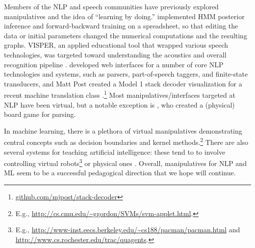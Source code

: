 \documentclass[11pt,letterpaper]{article}
\newcommand{\Note}[1]{}
\renewcommand{\Note}[1]{\hl{[#1]}}  %
\newcommand{\NoteSigned}[3]{{\sethlcolor{#2}\Note{#1: #3}}}
\newcommand{\NoteJE}[1]{\NoteSigned{JE}{LightGreen}{#1}}
\newcommand{\Commented}[1]{#1}
\begin{document}


Members of the NLP and speech communities have previously explored manipulatives and the idea of
``learning by doing.''
 implemented HMM posterior inference and
forward-backward training on a spreadsheet, so that editing the data or initial parameters
changed the numerical computations and the resulting graphs.  
VISPER, an applied educational tool that wrapped various speech technologies, 
was targeted toward understanding the acoustics and overall recognition pipeline 
\cite{nouza1997educational,nouza1999teaching} . 
 developed web interfaces for a number of core NLP technologies and systems, such as parsers, part-of-speech 
taggers, and finite-state transducers, and Matt Post created a Model 1 stack decoder visualization for a recent machine translation class \cite{lopez2013learning}.\footnote{\url{github.com/mjpost/stack-decoder}}
Most manipulatives/interfaces targeted at NLP have been virtual, but a notable exception is , 
who created a (physical) board game for parsing. 

In machine learning, there is a plethora of virtual manipulatives demonstrating central concepts such 
as decision boundaries and kernel
methods.\footnote{E.g.,
  \url{http://cs.cmu.edu/~ggordon/SVMs/svm-applet.html}.
}
There are also several systems for teaching artificial intelligence: these tend to to involve controlling 
virtual robots\footnote{E.g., \url{http://www-inst.eecs.berkeley.edu/~cs188/pacman/pacman.html} and 
\url{http://www.cs.rochester.edu/trac/quagents}.}
or physical ones \cite{tokic2012robot}.
Overall, manipulatives for NLP and ML seem to be a successful
pedagogical direction that we hope will continue.
\end{document}
